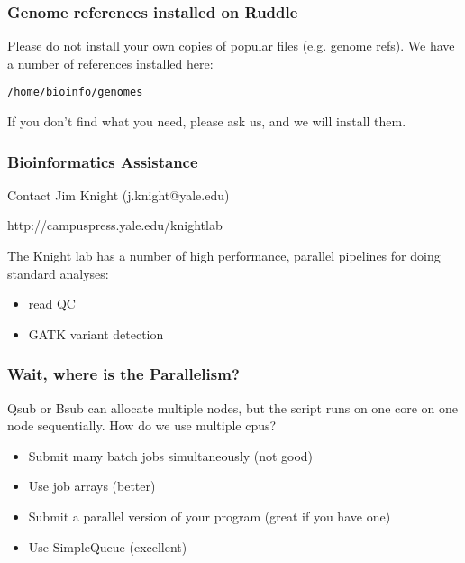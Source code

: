 \documentclass[10pt]{beamer}
\begin{document}
\begin{frame}[fragile]
\frametitle{Genome references installed on Ruddle}

Please do not install your own copies of popular files (e.g. genome refs).  
\vskip10pt
We have a number of references installed here:
\begin{verbatim}
/home/bioinfo/genomes
\end{verbatim}

If you don't find what you need, please ask us, and we will install them.

\end{frame}

\begin{frame}[fragile]
\frametitle{Bioinformatics Assistance}

Contact Jim Knight (j.knight@yale.edu)

http://campuspress.yale.edu/knightlab

The Knight lab has a number of high performance, parallel pipelines for
doing standard analyses:

\begin{itemize}
\item read QC
\item GATK variant detection
\end{itemize}
\end{frame}


\begin{frame}[fragile]
\frametitle{Wait, where is the Parallelism?}

Qsub or Bsub can allocate multiple nodes, but the script runs on one core on one node sequentially.  How do we use multiple cpus?

\begin{itemize}
\item Submit many batch jobs simultaneously (not good)
\item Use job arrays (better)
\item Submit a parallel version of your program (great if you have one)
\item Use SimpleQueue (excellent)
\end{itemize}

\end{frame}
\end{document}

